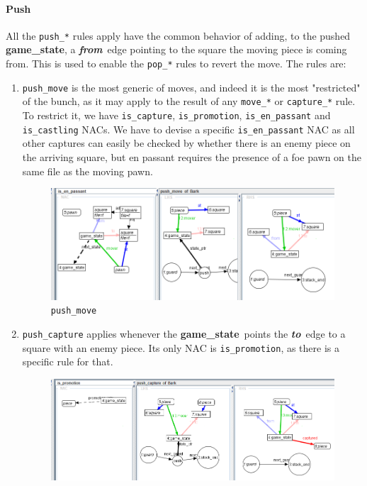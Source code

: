\documentclass[a4paper, 10pt]{scrartcl}
\newcommand{\noderepr}[1]{\textsf{\textbf{#1}}}
\newcommand{\edgerepr}[1]{\textit{\textbf{#1}}}
\newcommand{\gamestate}{\noderepr{game\_state}}
\newcommand{\tosquare}{\edgerepr{to}}
\newcommand{\fromsquare}{\edgerepr{from}}
\begin{document}
    \paragraph*{Push} All the \texttt{push\_*} rules apply have the common behavior of adding, to the pushed \gamestate, a \fromsquare\ edge pointing to the square the moving piece is coming from. This is used to enable the \texttt{pop\_*} rules to revert the move. The rules are:
    \begin{enumerate}
        \item \texttt{push\_move} is the most generic of moves, and indeed it is the most "restricted" of the bunch, as it may apply to the result of any \texttt{move\_*} or \texttt{capture\_*} rule. To restrict it, we have \texttt{is\_capture}, \texttt{is\_promotion}, \texttt{is\_en\_passant} and \texttt{is\_castling} NACs. We have to devise a specific \texttt{is\_en\_passant} NAC as all other captures can easily be checked by whether there is an enemy piece on the arriving square, but en passant requires the presence of a foe pawn on the same file as the moving pawn.
        \begin{figure}[H]
            \centering
            \includegraphics[width=.8\linewidth]{images/push_move.png}
            \caption{\texttt{push\_move}}
        \end{figure}
        \item \texttt{push\_capture} applies whenever the \gamestate\ points the \tosquare\ edge to a square with an enemy piece. Its only NAC is \texttt{is\_promotion}, as there is a specific rule for that.
        \begin{figure}[H]
            \centering
            \includegraphics[width=.8\linewidth]{images/push_capture.png}

\end{figure}
\end{enumerate}
\end{document}
